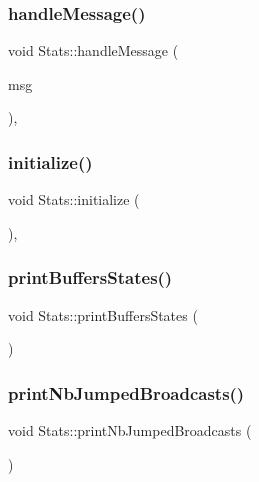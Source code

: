 \subsubsection{\texorpdfstring{handle\+Message()}{handleMessage()}}
{\footnotesize\ttfamily void Stats\+::handle\+Message (\begin{DoxyParamCaption}\item[{c\+Message $\ast$}]{msg }\end{DoxyParamCaption})\hspace{0.3cm}{\ttfamily [private]}, {\ttfamily [virtual]}}

\mbox{\label{classStats_a650afe7cc5721ec17cfdc94475365f89}} 
\subsubsection{\texorpdfstring{initialize()}{initialize()}}
{\footnotesize\ttfamily void Stats\+::initialize (\begin{DoxyParamCaption}{ }\end{DoxyParamCaption})\hspace{0.3cm}{\ttfamily [private]}, {\ttfamily [virtual]}}

\mbox{\label{classStats_a890d6dea5350042fd71313826b103583}} 
\subsubsection{\texorpdfstring{print\+Buffers\+States()}{printBuffersStates()}}
{\footnotesize\ttfamily void Stats\+::print\+Buffers\+States (\begin{DoxyParamCaption}{ }\end{DoxyParamCaption})\hspace{0.3cm}{\ttfamily [private]}}

\mbox{\label{classStats_aaba10264a569b9240a300ddc341e6a8c}} 
\subsubsection{\texorpdfstring{print\+Nb\+Jumped\+Broadcasts()}{printNbJumpedBroadcasts()}}
{\footnotesize\ttfamily void Stats\+::print\+Nb\+Jumped\+Broadcasts (\begin{DoxyParamCaption}{ }\end{DoxyParamCaption})\hspace{0.3cm}{\ttfamily [private]}}

